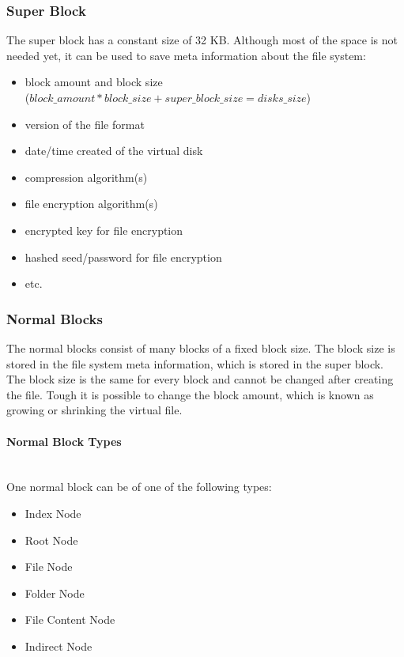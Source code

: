 \subsubsection{Super Block}

The super block has a constant size of 32 KB. Although most of the space is not needed yet, it can be used to save meta information about the file system:
\begin{itemize}
  \item block amount and block size\\
  ($block\_amount * block\_size + super\_block\_size = disks\_size$)
  \item version of the file format
  \item date/time created of the virtual disk
  \item compression algorithm(s)
  \item file encryption algorithm(s)
  \item encrypted key for file encryption
  \item hashed seed/password for file encryption
  \item etc.
\end{itemize}

\subsubsection{Normal Blocks}

The normal blocks consist of many blocks of a fixed block size. The block size is stored in the file system meta information, which is stored in the super block. The block size is the same for every block and cannot be changed after creating the file. Tough it is possible to change the block amount, which is known as growing or shrinking the virtual file.

\paragraph{Normal Block Types} ~\\

\noindent One normal block can be of one of the following types:

\begin{itemize}
  \item Index Node
    \item Root Node
    \item File Node
    \item Folder Node
  \item File Content Node
  \item Indirect Node
\end{itemize}

